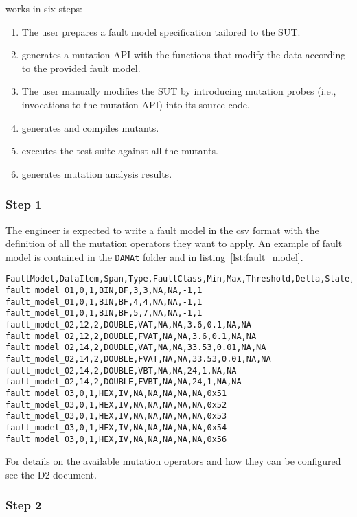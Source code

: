 \DAMA works in six steps:

\begin{enumerate}
	\item The user prepares a fault model specification tailored to the SUT.
	\item \DAMA generates a mutation API with the functions that modify the data according to the provided fault model.
	\item The user manually modifies the SUT by introducing mutation probes (i.e., invocations to the mutation API) into its source code.
	\item \DAMA generates and compiles mutants.
	\item \DAMA executes the test suite against all the mutants.
	\item \DAMA generates mutation analysis results.
\end{enumerate}

\subsubsection{Step 1}
The engineer is expected to write a fault model in the csv format with the definition of all the mutation operators they want to apply.
An example of fault model is contained in the \texttt{DAMAt} folder and in listing~\ref{lst:fault_model}.

\begin{lstlisting}[label={lst:fault_model}]
FaultModel,DataItem,Span,Type,FaultClass,Min,Max,Threshold,Delta,State,Value
fault_model_01,0,1,BIN,BF,3,3,NA,NA,-1,1
fault_model_01,0,1,BIN,BF,4,4,NA,NA,-1,1
fault_model_01,0,1,BIN,BF,5,7,NA,NA,-1,1
fault_model_02,12,2,DOUBLE,VAT,NA,NA,3.6,0.1,NA,NA
fault_model_02,12,2,DOUBLE,FVAT,NA,NA,3.6,0.1,NA,NA
fault_model_02,14,2,DOUBLE,VAT,NA,NA,33.53,0.01,NA,NA
fault_model_02,14,2,DOUBLE,FVAT,NA,NA,33.53,0.01,NA,NA
fault_model_02,14,2,DOUBLE,VBT,NA,NA,24,1,NA,NA
fault_model_02,14,2,DOUBLE,FVBT,NA,NA,24,1,NA,NA
fault_model_03,0,1,HEX,IV,NA,NA,NA,NA,NA,0x51
fault_model_03,0,1,HEX,IV,NA,NA,NA,NA,NA,0x52
fault_model_03,0,1,HEX,IV,NA,NA,NA,NA,NA,0x53
fault_model_03,0,1,HEX,IV,NA,NA,NA,NA,NA,0x54
fault_model_03,0,1,HEX,IV,NA,NA,NA,NA,NA,0x56
\end{lstlisting}

For details on the available mutation operators and how they can be configured see the D2 document.

\subsubsection{Step 2}

